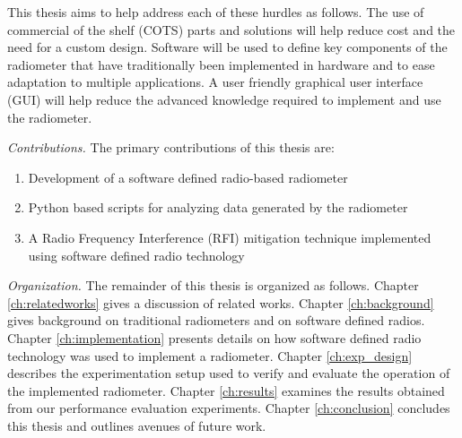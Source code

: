 This thesis aims to help address each of these hurdles as follows.  The use of commercial of the shelf (COTS) parts and solutions will help reduce cost and the need for a custom design.  Software will be used to define key components of the radiometer that have traditionally been implemented in hardware and to ease adaptation to multiple applications.  A user friendly graphical user interface (GUI) will help reduce the advanced knowledge required to implement and use the radiometer. 

\emph{Contributions.}  The primary contributions of this thesis are:

\begin{enumerate}
\item Development of a software defined radio-based radiometer
\item Python based scripts for analyzing data generated by the radiometer
\item A Radio Frequency Interference (RFI) mitigation technique implemented using software defined radio technology
\end{enumerate}

\emph{Organization.}  The remainder of this thesis is organized as follows.  Chapter \ref{ch:relatedworks} gives a discussion of related works.  Chapter \ref{ch:background} gives background on traditional radiometers and on software defined radios.  Chapter \ref{ch:implementation} presents details on how software defined radio technology was used to implement a radiometer.  Chapter \ref{ch:exp_design} describes the experimentation setup used to verify and evaluate the operation of the implemented radiometer.  Chapter \ref{ch:results} examines the results obtained from our performance evaluation experiments.  Chapter \ref{ch:conclusion} concludes this thesis and outlines avenues of future work.


